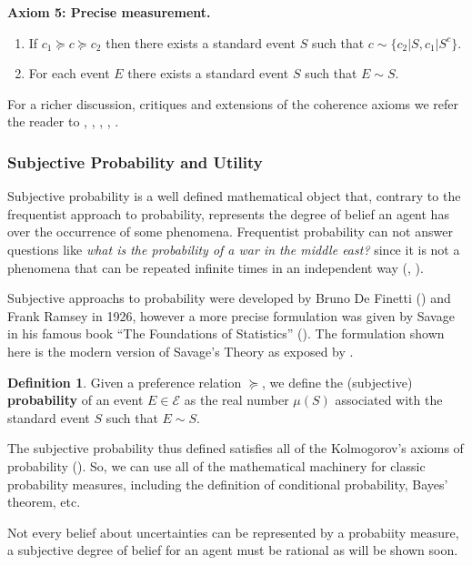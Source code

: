 \documentclass[english,letterpaper,12pt,final]{article}
\theoremstyle{definition}
\newtheorem{defi}{Definition}[section]
\begin{document}
	\textbf{Axiom 5: Precise measurement.}
	\begin{enumerate}[label=(\roman*)]
	\item If $c_1 \succeq c \succeq c_2$ then there exists a standard event $S$ such that $c \sim \{ c_2 | S, c_1 | S^c \}$.
	\item For each event $E$ there exists a standard event $S$ such that $E \sim S$.
	\end{enumerate}
	
	For a richer discussion, critiques and extensions of the coherence axioms we refer the reader to \cite{bernardo2000bayesian}, \cite{binmore2008rational}, \cite{gilboa2009decision}, \cite{wakker2010prospect}, \cite{peterson2017introduction}.
	\subsubsection{Subjective Probability and Utility}
Subjective probability is a well defined mathematical object that, contrary to the frequentist approach to probability, represents the degree of belief an agent has over the occurrence of some phenomena. Frequentist probability can not answer questions like \textit{what is the probability of a war in the middle east?} since it is not a phenomena that can be repeated infinite times in an independent way (\cite{gilboa2009decision}, \cite{peterson2017introduction}).

Subjective approachs to probability were developed by Bruno De Finetti (\cite{definetti1930}) and Frank Ramsey in 1926, however a more precise formulation was given by Savage in his famous book “The Foundations of Statistics” (\cite{savage1954the}). The formulation shown here is the modern version of Savage's Theory as exposed by \cite{bernardo2000bayesian}.

	\begin{defi}
	Given a preference relation $\succeq$, we define the (subjective) \textbf{probability} of an event $E \in \mathcal{E}$ as the real number $\mu(S)$ associated with the standard event $S$ such that $E \sim S$.
	\end{defi}
	The subjective probability thus defined satisfies all of the Kolmogorov's axioms of probability (\cite{bernardo2000bayesian}). So, we can use all of the mathematical machinery for classic probability measures, including the definition of conditional probability, Bayes' theorem, etc.
	
Not every belief about uncertainties can be represented by a probabiity measure, a subjective degree of belief for an agent must be rational as will be shown soon.	
	
\end{document}
